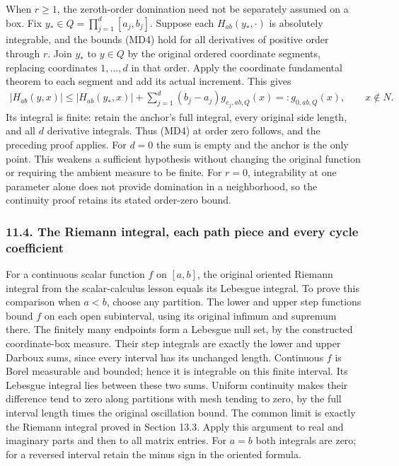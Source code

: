 \documentclass[
  11pt,
]{article}
\begin{document}
When \(r\geq1\), the zeroth-order domination need not be separately
assumed on a box. Fix \(y_*\in Q=\prod_{j=1}^d[a_j,b_j]\). Suppose each
\(H_{ab}(y_*,\cdot)\) is absolutely integrable, and the bounds (MD4)
hold for all derivatives of positive order through \(r\). Join \(y_*\)
to \(y\in Q\) by the original ordered coordinate segments, replacing
coordinates \(1,\ldots,d\) in that order. Apply the coordinate
fundamental theorem to each segment and add its actual increment. This
gives \[
\begin{gathered}
|H_{ab}(y,x)|\leq |H_{ab}(y_*,x)|
+\sum_{j=1}^d(b_j-a_j)g_{e_j,ab,Q}(x)
=:g_{0,ab,Q}(x),\qquad x\notin N .
\end{gathered}
\tag{MD10}
\] Its integral is finite: retain the anchor's full integral, every
original side length, and all \(d\) derivative integrals. Thus (MD4) at
order zero follows, and the preceding proof applies. For \(d=0\) the sum
is empty and the anchor is the only point. This weakens a sufficient
hypothesis without changing the original function or requiring the
ambient measure to be finite. For \(r=0\), integrability at one
parameter alone does not provide domination in a neighborhood, so the
continuity proof retains its stated order-zero bound.

\subsubsection{11.4. The Riemann integral, each path piece and every
cycle
coefficient}\label{the-riemann-integral-each-path-piece-and-every-cycle-coefficient}

For a continuous scalar function \(f\) on \([a,b]\), the original
oriented Riemann integral from the scalar-calculus lesson equals its
Lebesgue integral. To prove this comparison when \(a<b\), choose any
partition. The lower and upper step functions bound \(f\) on each open
subinterval, using its original infimum and supremum there. The finitely
many endpoints form a Lebesgue null set, by the constructed
coordinate-box measure. Their step integrals are exactly the lower and
upper Darboux sums, since every interval has its unchanged length.
Continuous \(f\) is Borel measurable and bounded; hence it is integrable
on this finite interval. Its Lebesgue integral lies between these two
sums. Uniform continuity makes their difference tend to zero along
partitions with mesh tending to zero, by the full interval length times
the original oscillation bound. The common limit is exactly the Riemann
integral proved in Section 13.3. Apply this argument to real and
imaginary parts and then to all matrix entries. For \(a=b\) both
integrals are zero; for a reversed interval retain the minus sign in the
oriented formula.
\end{document}
